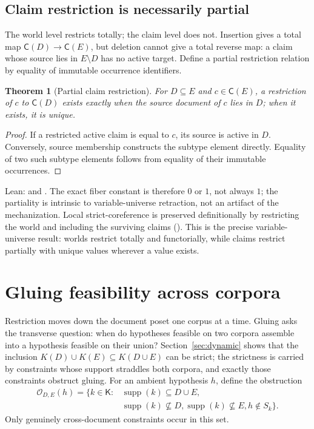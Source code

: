 \documentclass[11pt]{article}
\newtheorem{theorem}{Theorem}[section]
\theoremstyle{definition}
\theoremstyle{remark}
\newcommand{\Claims}{\mathsf C}
\newcommand{\Constraints}{\mathsf K}
\begin{document}
\subsection{Claim restriction is necessarily partial}

The world level restricts totally; the claim level does not.  Insertion gives
a total map $\Claims(D)\to\Claims(E)$, but deletion cannot give a total
reverse map: a claim whose source lies in $E\setminus D$ has no active target.
Define a partial restriction relation by equality of immutable occurrence
identifiers.

\begin{theorem}[Partial claim restriction]
For $D\subseteq E$ and $c\in\Claims(E)$, a restriction of $c$ to
$\Claims(D)$ exists exactly when the source document of $c$ lies in $D$; when
it exists, it is unique.
\end{theorem}
\begin{proof}
If a restricted active claim is equal to $c$, its source is active in $D$.
Conversely, source membership constructs the subtype element directly.
Equality of two such subtype elements follows from equality of their immutable
occurrences.
\end{proof}
\noindent Lean:  and
.  The exact fiber constant is therefore
$0$ or $1$, not always $1$; the partiality is intrinsic to variable-universe
retraction, not an artifact of the mechanization.  Local strict-coreference is
preserved definitionally by restricting the world and including the surviving
claims ().  This is the precise variable-universe
result: worlds restrict totally and functorially, while claims restrict
partially with unique values wherever a value exists.

\section{Gluing feasibility across corpora}\label{sec:gluing}

Restriction moves down the document poset one corpus at a time.  Gluing asks
the transverse question: when do hypotheses feasible on two corpora assemble
into a hypothesis feasible on their union?  Section~\ref{sec:dynamic} shows
that the inclusion $K(D)\cup K(E)\subseteq K(D\cup E)$ can be strict; the
strictness is carried by constraints whose support straddles both corpora, and
exactly those constraints obstruct gluing.  For an ambient hypothesis $h$,
define the obstruction
\begin{align*}
 \mathcal O_{D,E}(h)=\{k\in\Constraints:
   &\operatorname{supp}(k)\subseteq D\cup E,\\
   &\operatorname{supp}(k)\nsubseteq D,
    \operatorname{supp}(k)\nsubseteq E,
    h\notin S_k\}.
\end{align*}
Only genuinely cross-document constraints occur in this set.
\end{document}
